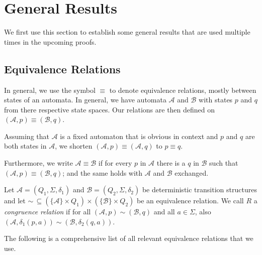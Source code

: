 \section{General Results}
We first use this section to establish some general results that are used multiple times in the upcoming proofs.

\subsection{Equivalence Relations}

In general, we use the symbol $\equiv$ to denote equivalence relations, mostly between states of an automata. In general, we have automata $\mathcal{A}$ and $\mathcal{B}$ with states $p$ and $q$ from there respective state spaces. Our relations are then defined on $(\mathcal{A}, p) \equiv (\mathcal{B}, q)$.

\begin{defn}
	Assuming that $\mathcal{A}$ is a fixed automaton that is obvious in context and $p$ and $q$ are both states in $\mathcal{A}$, we shorten $(\mathcal{A}, p) \equiv (\mathcal{A}, q)$ to $p \equiv q$.
	
	Furthermore, we write $\mathcal{A} \equiv \mathcal{B}$ if for every $p$ in $\mathcal{A}$ there is a $q$ in $\mathcal{B}$ such that $(\mathcal{A}, p) \equiv (\mathcal{B}, q)$; and the same holds with $\mathcal{A}$ and $\mathcal{B}$ exchanged.
\end{defn}

\begin{defn}
	Let $\mathcal{A} = (Q_1, \Sigma, \delta_1)$ and $\mathcal{B} = (Q_2, \Sigma, \delta_2)$ be deterministic transition structures and let $\sim \,\subseteq (\{\mathcal{A}\} \times Q_1) \times (\{\mathcal{B}\} \times Q_2)$ be an equivalence relation. We call $R$ a \emph{congruence relation} if for all $(\mathcal{A}, p) \sim (\mathcal{B}, q)$ and all $a \in \Sigma$, also $(\mathcal{A}, \delta_1(p, a)) \sim (\mathcal{B}, \delta_2(q, a))$.
\end{defn}


\vspace{5pt}
The following is a comprehensive list of all relevant equivalence relations that we use.

